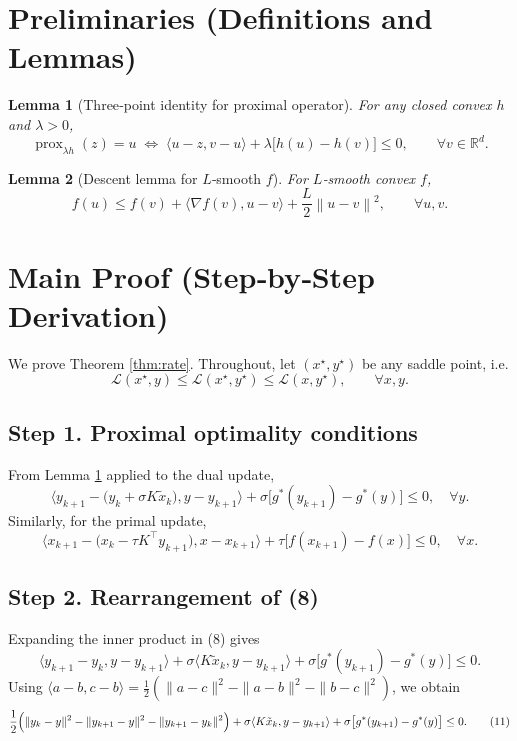 \documentclass[11pt]{article}
\newtheorem{lemma}{Lemma}
\newcommand{\prox}{\operatorname{prox}}
\newcommand{\ip}[2]{\langle #1,#2\rangle}
\newcommand{\norm}[1]{\left\|#1\right\|}
\begin{document}
\newpage
\section*{Preliminaries (Definitions and Lemmas)}
\begin{lemma}[Three‑point identity for proximal operator]\label{lem:prox}
For any closed convex $h$ and $\lambda>0$,
\[
\prox_{\lambda h}(z)=u
\;\Longleftrightarrow\;
\ip{u-z}{v-u}+\lambda\bigl[h(u)-h(v)\bigr]\le0,
\qquad\forall v\in\mathbb{R}^{d}.
\tag{5}
\]
\end{lemma}
\begin{lemma}[Descent lemma for $L$‑smooth $f$]\label{lem:descent}
For $L$‑smooth convex $f$,
\[
f(u)\le f(v)+\ip{\nabla f(v)}{u-v}+\frac{L}{2}\norm{u-v}^{2},
\qquad\forall u,v.
\tag{6}
\]
\end{lemma}

\section*{Main Proof (Step‑by‑Step Derivation)}
We prove Theorem \ref{thm:rate}. Throughout, let $(x^{\star},y^{\star})$ be any saddle point, i.e.
\[
\mathcal{L}(x^{\star},y)\le\mathcal{L}(x^{\star},y^{\star})\le\mathcal{L}(x,y^{\star}),\qquad\forall x,y.
\tag{7}
\]

\subsection*{Step 1.  Proximal optimality conditions}
From Lemma \ref{lem:prox} applied to the dual update,
\[
\ip{y_{k+1}-\bigl(y_k+\sigma K\tilde x_k\bigr)}{y-y_{k+1}}
   +\sigma\bigl[g^{*}(y_{k+1})-g^{*}(y)\bigr]\le0,\quad\forall y.
\tag{8}
\]
Similarly, for the primal update,
\[
\ip{x_{k+1}-\bigl(x_k-\tau K^{\!\top}y_{k+1}\bigr)}{x-x_{k+1}}
   +\tau\bigl[f(x_{k+1})-f(x)\bigr]\le0,\quad\forall x.
\tag{9}
\]

\subsection*{Step 2.  Rearrangement of (8)}
Expanding the inner product in (8) gives
\[
\ip{y_{k+1}-y_k}{y-y_{k+1}}
   +\sigma\ip{K\tilde x_k}{y-y_{k+1}}
   +\sigma\bigl[g^{*}(y_{k+1})-g^{*}(y)\bigr]\le0.
\tag{10}
\]
Using $\ip{a-b}{c-b}=\tfrac12(\|a-c\|^{2}-\|a-b\|^{2}-\|b-c\|^{2})$, we obtain
\[
\frac12\Bigl(\|y_k-y\|^{2}-\|y_{k+1}-y\|^{2}-\|y_{k+1}-y_k\|^{2}\Bigr)
   +\sigma\ip{K\tilde x_k}{y-y_{k+1}}
   +\sigma\bigl[g^{*}(y_{k+1})-g^{*}(y)\bigr]\le0.
\tag{11}
\]
\end{document}

